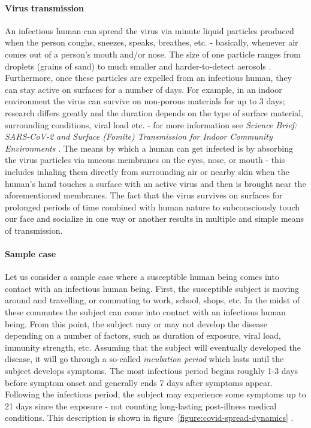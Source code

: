 \documentclass[a4paper]{article}
\begin{document}
\paragraph{Virus transmission}
An infectious human can spread the virus via minute liquid particles produced when the person coughs, sneezes, speaks, breathes, etc. - basically, whenever air comes out of a person's mouth and/or nose. The size of one particle ranges from droplets (grains of sand) to much smaller and harder-to-detect aerosols \cite{WHO2021}. Furthermore, once these particles are expelled from an infectious human, they can stay active on surfaces for a number of days. For example, in an indoor environment the virus can survive on non-porous materials for up to 3 days; research differs greatly and the duration depends on the type of surface material, surrounding conditions, viral load etc. - for more information see \textit{Science Brief: SARS-CoV-2 and Surface (Fomite) Transmission for Indoor Community Environments} \cite{CDC5April2021}. The means by which a human can get infected is by absorbing the virus particles via mucous membranes on the eyes, nose, or mouth - this includes inhaling them directly from surrounding air or nearby skin when the human's hand touches a surface with an active virus and then is brought near the aforementioned membranes. The fact that the virus survives on surfaces for prolonged periods of time combined with human nature to subconsciously touch our face and socialize in one way or another results in multiple and simple means of transmission.

\paragraph{Sample case}
Let us consider a sample case where a susceptible human being comes into contact with an infectious human being. First, the susceptible subject is moving around and travelling, or commuting to work, school, shops, etc. In the midst of these commutes the subject can come into contact with an infectious human being. From this point, the subject may or may not develop the disease depending on a number of factors, such as duration of exposure, viral load, immunity strength, etc. Assuming that the subject will eventually developed the disease, it will go through a so-called \textit{incubation period} which lasts until the subject develops symptoms. The most infectious period begins roughly 1-3 days before symptom onset and generally ends 7 days after symptoms appear. Following the infectious period, the subject may experience some symptoms up to 21 days since the exposure - not counting long-lasting post-illness medical conditions. This description is shown in figure~\ref{figure:covid-spread-dynamics} \cite{Maltezos2021}.
\end{document}
